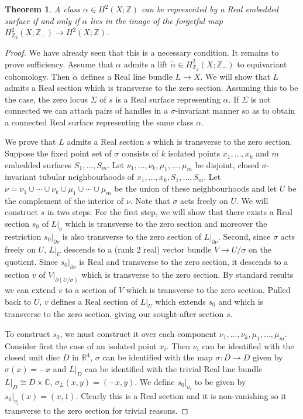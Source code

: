 \documentclass{amsart}
\newtheorem{theorem}{Theorem}[section]
\theoremstyle{definition}
\theoremstyle{remark}
\numberwithin{equation}{section}
\begin{document}
\begin{theorem}\label{thm:realise}
A class $\alpha \in H^2(X ; \mathbb{Z})$ can be represented by a Real embedded surface if and only if $\alpha$ lies in the image of the forgetful map $H^2_{\mathbb{Z}_2}(X ; \mathbb{Z}_-) \to H^2(X ; \mathbb{Z})$.
\end{theorem}
\begin{proof}
We have already seen that this is a necessary condition. It remains to prove sufficiency. Assume that $\alpha$ admits a lift $\widetilde{\alpha} \in H^2_{\mathbb{Z}_2}(X ; \mathbb{Z}_-)$ to equivariant cohomology. Then $\widetilde{\alpha}$ defines a Real line bundle $L \to X$. We will show that $L$ admits a Real section which is transverse to the zero section. Assuming this to be the case, the zero locus $\Sigma$ of $s$ is a Real surface representing $\alpha$. If $\Sigma$ is not connected we can attach pairs of handles in a $\sigma$-invariant manner so as to obtain a connected Real surface representing the same class $\alpha$.

We prove that $L$ admits a Real section $s$ which is transverse to the zero section. Suppose the fixed point set of $\sigma$ consists of $k$ isolated points $x_1, \dots , x_k$ and $m$ embedded surfaces $S_1, \dots , S_m$. Let $\nu_1, \dots , \nu_k , \mu_1 , \dots , \mu_m$ be disjoint, closed $\sigma$-invariant tubular neighbourhoods of $x_1, \dots , x_k, S_1 , \dots , S_m$. Let $\nu = \nu_1 \cup \cdots \cup \nu_k \cup \mu_1 \cup \cdots \cup \mu_m$ be the union of these neighbourhoods and let $U$ be the complement of the interior of $\nu$. Note that $\sigma$ acts freely on $U$. We will construct $s$ in two steps. For the first step, we will show that there exists a Real section $s_0$ of $L|_{\nu}$ which is transverse to the zero section and moreover the restriction $s_0|_{\partial \nu}$ is also transverse to the zero section of $L|_{\partial \nu}$. Second, since $\sigma$ acts freely on $U$, $L|_U$ descends to a (rank $2$ real) vector bundle $V \to U/\sigma$ on the quotient. Since $s_0|_{\partial \nu}$ is Real and transverse to the zero section, it descends to a section $v$ of $V|_{\partial (U/\sigma)}$ which is transverse to the zero section. By standard results we can extend $v$ to a section of $V$ which is transverse to the zero section. Pulled back to $U$, $v$ defines a Real section of $L|_U$ which extends $s_0$ and which is transverse to the zero section, giving our sought-after section $s$.

To construct $s_0$, we must construct it over each component $\nu_1, \dots , \nu_k , \mu_1 , \dots , \mu_m$. Consider first the case of an isolated point $x_i$. Then $\nu_i$ can be identified with the closed unit disc $D$ in $\mathbb{R}^4$, $\sigma$ can be identified with the map $\sigma : D \to D$ given by $\sigma(x) = -x$ and $L|_D$ can be identified with the trivial Real line bundle $L|_D \cong D \times \mathbb{C}$, $\sigma_L(x,y) = (-x , \overline{y})$. We define $s_0|_{\nu_i}$ to be given by $s_0|_{\nu_i}(x) = (x,1)$. Clearly this is a Real section and it is non-vanishing so it transverse to the zero section for trivial reasons.


\end{proof}
\end{document}
